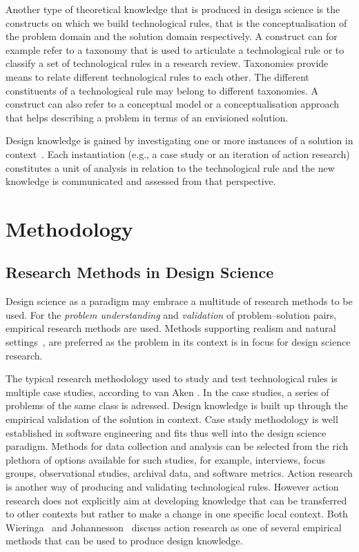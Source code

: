 \documentclass[graybox]{svmult}
\begin{document}
Another type of theoretical knowledge that is produced in design science is the 
constructs on which we build technological rules, that is the conceptualisation of the problem domain and the solution domain respectively.  
A construct can for example refer to a taxonomy that is used to articulate a technological rule or to classify a set of technological rules in a research review. Taxonomies provide means to relate different technological rules to each other. The different constituents of a technological rule may belong to different taxonomies. A construct can also refer to a conceptual model or a conceptualisation approach that helps describing a problem in terms of an envisioned solution.

Design knowledge is gained by investigating one or more instances of a solution in context~\cite{wieringa_what_2014}. Each instantiation (e.g., a case study or an iteration of action research) constitutes a unit of analysis in relation to the technological rule and the new knowledge is communicated and assessed from that perspective. 


\section{Methodology}

\subsection{Research Methods in Design Science} 


Design science as a paradigm may embrace a multitude of research methods to be used. For the \emph{problem understanding} and \emph{validation} of problem--solution pairs, empirical research methods are used. Methods supporting realism and natural settings~\cite{StolABC18}, are preferred as the problem in its context is in focus for design science research. 

The typical research methodology used to study and test technological rules is multiple case studies, according to van Aken \cite{van_aken_management_2004}. In the case studies, a series of problems of the same class is adressed. Design knowledge is built up through the empirical validation of the solution in context. Case study methodology is well established in software engineering \cite{Runeson12Case} and fits thus well into the design science paradigm. Methods for data collection and analysis can be selected from the rich plethora of options available for such studies, for example, interviews, focus groups, observational studies, archival data, and software metrics. Action research is another way of producing and validating technological rules. However action research does not explicitly aim at developing knowledge that can be transferred to other contexts but rather to make a change in one specific local context. Both Wieringa~\cite{wieringa_technical_2012} and Johannesson~\cite{johannesson_introduction_2014} discuss action research as one of several empirical methods that can be used to produce design knowledge.
\end{document}
